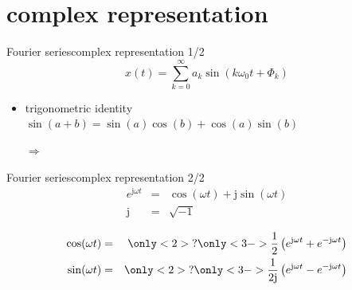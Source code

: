         \section{complex representation}
        \begin{frame}{Fourier series}{complex representation 1/2}
            \begin {equation*}
                x(t) = \sum\limits_{k=0}^{\infty} a_k \sin(k\omega_0 t + \Phi_k) \nonumber
            \end {equation*}
            \pause
            \begin{itemize}
                \item   trigonometric identity $\sin(a+b) = \sin(a)\cos(b) + \cos(a)\sin(b)$
                \item[$\Rightarrow$]
            \end{itemize}
        \end{frame}
        \begin{frame}{Fourier series}{complex representation 2/2}
            \begin{eqnarray*}
                e^{\mathrm{j}\omega t} &=& \cos(\omega t) + \mathrm{j}\sin(\omega t)\nonumber\\
                \mathrm{j} &=& \sqrt{-1}\nonumber
            \end{eqnarray*}

            \begin{eqnarray*}
                \cos(\omega t) &=& \only<2>{?}\only<3->{\frac{1}{2}\left(e^{\mathrm{j}\omega t} + e^{-\mathrm{j}\omega t}\right)}\nonumber\\
                \sin(\omega t) &=& \only<2>{?}\only<3->{\frac{1}{2\mathrm{j}}\left(e^{\mathrm{j}\omega t} - e^{-\mathrm{j}\omega t}\right)}\nonumber
            \end{eqnarray*}
        \end{frame}
